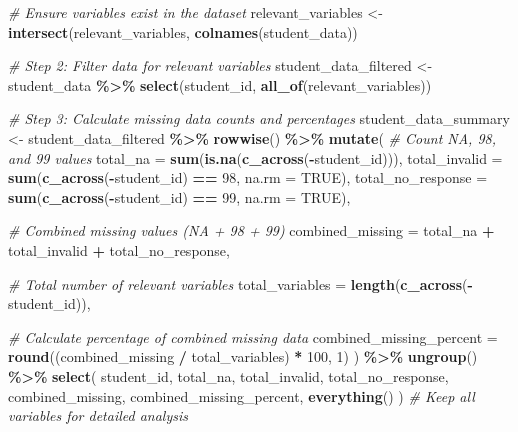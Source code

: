 \documentclass[
]{article}
\newenvironment{Shaded}{\begin{snugshade}}{\end{snugshade}}
\newcommand{\AttributeTok}[1]{\textcolor[rgb]{0.13,0.29,0.53}{#1}}
\newcommand{\CommentTok}[1]{\textcolor[rgb]{0.56,0.35,0.01}{\textit{#1}}}
\newcommand{\ConstantTok}[1]{\textcolor[rgb]{0.56,0.35,0.01}{#1}}
\newcommand{\DecValTok}[1]{\textcolor[rgb]{0.00,0.00,0.81}{#1}}
\newcommand{\FunctionTok}[1]{\textcolor[rgb]{0.13,0.29,0.53}{\textbf{#1}}}
\newcommand{\NormalTok}[1]{#1}
\newcommand{\OtherTok}[1]{\textcolor[rgb]{0.56,0.35,0.01}{#1}}
\newcommand{\SpecialCharTok}[1]{\textcolor[rgb]{0.81,0.36,0.00}{\textbf{#1}}}
\begin{document}
\begin{Shaded}
\begin{Highlighting}[]
\CommentTok{\# Ensure variables exist in the dataset}
\NormalTok{relevant\_variables }\OtherTok{\textless{}{-}} \FunctionTok{intersect}\NormalTok{(relevant\_variables, }\FunctionTok{colnames}\NormalTok{(student\_data))}

\CommentTok{\# Step 2: Filter data for relevant variables}
\NormalTok{student\_data\_filtered }\OtherTok{\textless{}{-}}\NormalTok{ student\_data }\SpecialCharTok{\%\textgreater{}\%}
  \FunctionTok{select}\NormalTok{(student\_id, }\FunctionTok{all\_of}\NormalTok{(relevant\_variables))}

\CommentTok{\# Step 3: Calculate missing data counts and percentages}
\NormalTok{student\_data\_summary }\OtherTok{\textless{}{-}}\NormalTok{ student\_data\_filtered }\SpecialCharTok{\%\textgreater{}\%}
  \FunctionTok{rowwise}\NormalTok{() }\SpecialCharTok{\%\textgreater{}\%}
  \FunctionTok{mutate}\NormalTok{(}
    \CommentTok{\# Count NA, 98, and 99 values}
    \AttributeTok{total\_na =} \FunctionTok{sum}\NormalTok{(}\FunctionTok{is.na}\NormalTok{(}\FunctionTok{c\_across}\NormalTok{(}\SpecialCharTok{{-}}\NormalTok{student\_id))),}
    \AttributeTok{total\_invalid =} \FunctionTok{sum}\NormalTok{(}\FunctionTok{c\_across}\NormalTok{(}\SpecialCharTok{{-}}\NormalTok{student\_id) }\SpecialCharTok{==} \DecValTok{98}\NormalTok{, }\AttributeTok{na.rm =} \ConstantTok{TRUE}\NormalTok{),}
    \AttributeTok{total\_no\_response =} \FunctionTok{sum}\NormalTok{(}\FunctionTok{c\_across}\NormalTok{(}\SpecialCharTok{{-}}\NormalTok{student\_id) }\SpecialCharTok{==} \DecValTok{99}\NormalTok{, }\AttributeTok{na.rm =} \ConstantTok{TRUE}\NormalTok{),}
    
    \CommentTok{\# Combined missing values (NA + 98 + 99)}
    \AttributeTok{combined\_missing =}\NormalTok{ total\_na }\SpecialCharTok{+}\NormalTok{ total\_invalid }\SpecialCharTok{+}\NormalTok{ total\_no\_response,}
    
    \CommentTok{\# Total number of relevant variables}
    \AttributeTok{total\_variables =} \FunctionTok{length}\NormalTok{(}\FunctionTok{c\_across}\NormalTok{(}\SpecialCharTok{{-}}\NormalTok{student\_id)),}
    
    \CommentTok{\# Calculate percentage of combined missing data}
    \AttributeTok{combined\_missing\_percent =} \FunctionTok{round}\NormalTok{((combined\_missing }\SpecialCharTok{/}\NormalTok{ total\_variables) }\SpecialCharTok{*} \DecValTok{100}\NormalTok{, }\DecValTok{1}\NormalTok{)}
\NormalTok{  ) }\SpecialCharTok{\%\textgreater{}\%}
  \FunctionTok{ungroup}\NormalTok{() }\SpecialCharTok{\%\textgreater{}\%}
  \FunctionTok{select}\NormalTok{(}
\NormalTok{    student\_id, total\_na, total\_invalid, total\_no\_response, }
\NormalTok{    combined\_missing, combined\_missing\_percent, }\FunctionTok{everything}\NormalTok{()}
\NormalTok{  )  }\CommentTok{\# Keep all variables for detailed analysis}


\end{Highlighting}
\end{Shaded}
\end{document}

